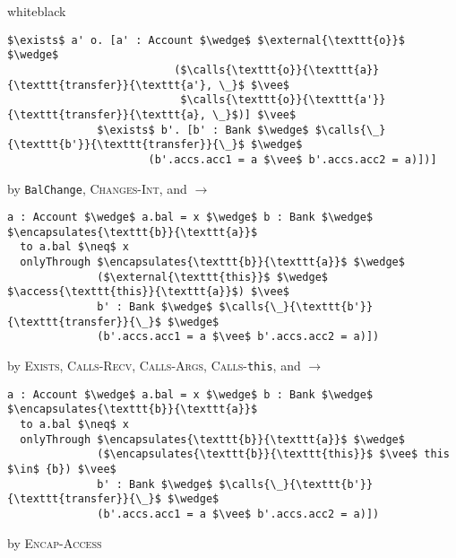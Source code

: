 \documentclass[acmsmall,review,anonymous]{acmart}\settopmatter{printfolios=true,printccs=false,printacmref=false}
\begin{document}
\begin{proofBox}{white}{black}
\begin{minipage}{0.75\textwidth}
\begin{lstlisting}[language = Chainmail, mathescape=true]
              $\exists$ a' o. [a' : Account $\wedge$ $\external{\texttt{o}}$ $\wedge$ 
                          ($\calls{\texttt{o}}{\texttt{a}}{\texttt{transfer}}{\texttt{a'}, \_}$ $\vee$ 
                           $\calls{\texttt{o}}{\texttt{a'}}{\texttt{transfer}}{\texttt{a}, \_}$)] $\vee$
              $\exists$ b'. [b' : Bank $\wedge$ $\calls{\_}{\texttt{b'}}{\texttt{transfer}}{\_}$ $\wedge$ 
                      (b'.accs.acc1 = a $\vee$ b'.accs.acc2 = a)])]
\end{lstlisting}
\end{minipage}
\begin{minipage}{0.24\textwidth}
\scriptsize
\hfill by \texttt{BalChange}, \textsc{Changes-Int}, and $\longrightarrow$
\end{minipage}
\begin{minipage}{0.75\textwidth}
\begin{lstlisting}[language = Chainmail, mathescape=true]
a : Account $\wedge$ a.bal = x $\wedge$ b : Bank $\wedge$ $\encapsulates{\texttt{b}}{\texttt{a}}$
  to a.bal $\neq$ x
  onlyThrough $\encapsulates{\texttt{b}}{\texttt{a}}$ $\wedge$ 
              ($\external{\texttt{this}}$ $\wedge$ $\access{\texttt{this}}{\texttt{a}}$) $\vee$
              b' : Bank $\wedge$ $\calls{\_}{\texttt{b'}}{\texttt{transfer}}{\_}$ $\wedge$ 
              (b'.accs.acc1 = a $\vee$ b'.accs.acc2 = a)])
\end{lstlisting}
\end{minipage}
\begin{minipage}{0.24\textwidth}
\scriptsize
\hfill by \textsc{Exists}, \textsc{Calls-Recv}, \textsc{Calls-Args}, \textsc{Calls-}\texttt{this}, and $\longrightarrow$
\end{minipage}
\begin{minipage}{0.75\textwidth}
\begin{lstlisting}[language = Chainmail, mathescape=true]
a : Account $\wedge$ a.bal = x $\wedge$ b : Bank $\wedge$ $\encapsulates{\texttt{b}}{\texttt{a}}$
  to a.bal $\neq$ x
  onlyThrough $\encapsulates{\texttt{b}}{\texttt{a}}$ $\wedge$ 
              ($\encapsulates{\texttt{b}}{\texttt{this}}$ $\vee$ this $\in$ {b}) $\vee$
              b' : Bank $\wedge$ $\calls{\_}{\texttt{b'}}{\texttt{transfer}}{\_}$ $\wedge$ 
              (b'.accs.acc1 = a $\vee$ b'.accs.acc2 = a)])
\end{lstlisting}
\end{minipage}
\begin{minipage}{0.24\textwidth}
\scriptsize
\hfill by \textsc{Encap-Access}
\end{minipage}

\end{proofBox}
\end{document}
